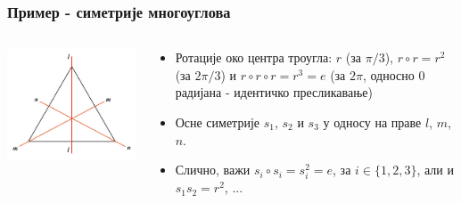 \documentclass{beamer}
\theoremstyle{plain}
\theoremstyle{definition}
\begin{document}
\begin{frame}
\frametitle{Пример - симетрије многоуглова}
\begin{columns}[T]
    \begin{column}{0.5\textwidth}
      \centering
      \includegraphics[width=\textwidth]{trougao}
    \end{column}
    \begin{column}{0.5\textwidth}
      \begin{itemize}
         \item Ротације око центра троугла: $r$ (за $\pi/3$), $r\circ r = r^2$ (за $2\pi/3$) и $r\circ r \circ r = r^3 = e$ (за $2\pi$, односно $0$ радијана - идентичко пресликавање)
         \item Осне симетрије $s_1$, $s_2$ и $s_3$ у односу на праве $l$, $m$, $n$.
         \item Слично, важи $s_i \circ s_i = s_i^2 = e$, за $i\in \lbrace 1, 2, 3 \rbrace$, али и $s_1 s_2 = r^2$, ...
       \end{itemize}
    \end{column}
  \end{columns}
\end{frame}
\end{document}
